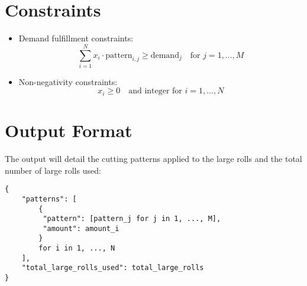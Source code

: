\documentclass{article}
\begin{document}
\section*{Constraints}
\begin{itemize}
    \item Demand fulfillment constraints:
    \[
    \sum_{i=1}^{N} x_i \cdot \text{pattern}_{i,j} \geq \text{demand}_j \quad \text{for } j = 1, \ldots, M
    \]
    
    \item Non-negativity constraints:
    \[
    x_i \geq 0 \quad \text{and integer for } i = 1, \ldots, N
    \]
\end{itemize}

\section*{Output Format}
The output will detail the cutting patterns applied to the large rolls and the total number of large rolls used:
\begin{verbatim}
{
    "patterns": [
        {
         "pattern": [pattern_j for j in 1, ..., M],
         "amount": amount_i
        }
        for i in 1, ..., N
    ],
    "total_large_rolls_used": total_large_rolls
}
\end{verbatim}
\end{document}
